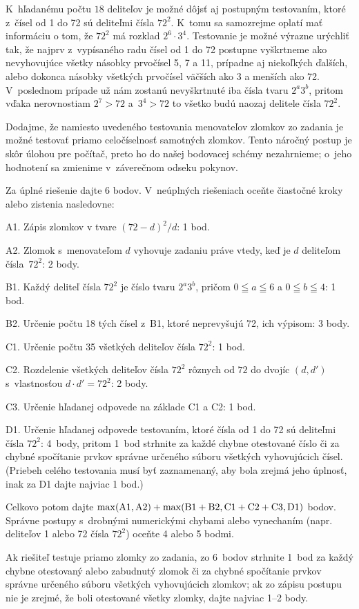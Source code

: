 {\poznamka
K~hľadanému počtu $18$ deliteľov je možné dôjsť aj postupným testovaním,
ktoré z~čísel od 1 do 72 sú deliteľmi čísla $72^2$. K~tomu sa
samozrejme oplatí mať informáciu o tom, že $72^2$ má rozklad
$2^6\cdot3^4$. Testovanie je možné výrazne urýchliť
tak, že najprv z~vypísaného radu čísel od 1 do 72 postupne vyškrtneme ako
nevyhovujúce všetky násobky prvočísel 5, 7 a 11,
prípadne aj niekoľkých ďalších, alebo dokonca násobky
všetkých prvočísel väčších ako 3 a menších ako 72. V~poslednom prípade
už nám zostanú nevyškrtnuté iba čísla tvaru $2^a3^b$,
pritom vďaka nerovnostiam $2^7>72$ a~$3^4>72$
to všetko budú naozaj delitele čísla $72^2$.

Dodajme, že namiesto uvedeného testovania menovateľov zlomkov zo
zadania je možné testovať priamo celočíselnosť samotných zlomkov. Tento
náročný postup je skôr úlohou pre počítač, preto ho do našej
bodovacej schémy nezahrnieme; o~jeho hodnotení sa zmienime
v~záverečnom odseku pokynov.

\schemaABC
Za úplné riešenie dajte 6 bodov. V~neúplných
riešeniach oceňte čiastočné kroky alebo zistenia nasledovne:
\item{A1.} Zápis zlomkov v tvare $(72-d)^2/d$: 1 bod.
\item{A2.} Zlomok s~menovateľom $d$ vyhovuje zadaniu práve vtedy, keď je $d$ deliteľom čísla~$72^2$: 2 body.
\item{B1.} Každý deliteľ čísla $72^2$ je číslo tvaru $2^a3^b$, pričom $0\leqq a\leqq 6$ a $0\leqq b\leqq 4$: 1 bod.
\item{B2.} Určenie počtu 18 tých čísel z~B1, ktoré neprevyšujú 72, ich výpisom: 3 body.
\item{C1.} Určenie počtu 35 všetkých deliteľov čísla $72^2$: 1 bod.
\item{C2.} Rozdelenie všetkých deliteľov čísla $72^2$ rôznych od $72$ do dvojíc $(d,d')$ s~vlastnosťou $d\cdot d'=72^2$: 2 body.
\item{C3.} Určenie hľadanej odpovede na základe C1 a C2: 1 bod.
\item{D1.} Určenie hľadanej odpovede testovaním, ktoré čísla od 1 do 72 sú deliteľmi čísla $72^2$: 4~body, pritom 1~bod strhnite za každé chybne otestované číslo či za chybné spočítanie prvkov správne určeného súboru všetkých vyhovujúcich čísel. (Priebeh celého testovania musí byť zaznamenaný, aby bola zrejmá jeho úplnosť, inak za D1 dajte najviac 1 bod.)

\noindent
Celkovo potom dajte
$\rm\max(A1,A2)+\max(B1+B2,C1+C2+C3,D1)$ bodov. Správne
postupy s~drobnými numerickými chybami alebo vynechaním (napr.
deliteľov 1 alebo 72 čísla $72^2$) oceňte 4 alebo 5 bodmi.

Ak riešiteľ testuje priamo zlomky zo zadania, zo 6~bodov
strhnite 1~bod za každý chybne otestovaný alebo zabudnutý zlomok
či za chybné spočítanie prvkov správne určeného súboru
všetkých vyhovujúcich zlomkov; ak zo zápisu postupu nie je
zrejmé, že boli otestované všetky zlomky,
dajte najviac 1--2 body.
\endschema
}

